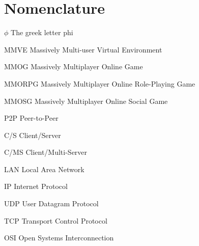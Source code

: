 \chapter{Nomenclature}

\newlength{\gnat}

\begin{Nomencl}[\gnat]

		\item[$\phi$]		The greek letter phi
		
		\item[MMVE]		Massively Multi-user Virtual Environment
        \item[MMOG]		Massively Multiplayer Online Game
        \item[MMORPG]   Massively Multiplayer Online Role-Playing Game
        \item[MMOSG]    Massively Multiplayer Online Social Game
        \item[P2P]      Peer-to-Peer
        \item[C/S]      Client/Server
        \item[C/MS]     Client/Multi-Server
        \item[LAN]      Local Area Network
        \item[IP]       Internet Protocol
        \item[UDP]      User Datagram Protocol
        \item[TCP]      Transport Control Protocol
        \item[OSI]      Open Systems Interconnection
\end{Nomencl}
\endinput

